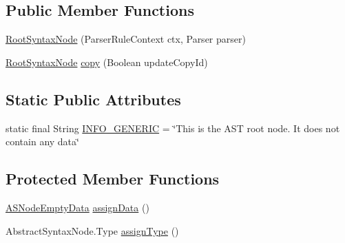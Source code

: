\subsection*{Public Member Functions}
\begin{DoxyCompactItemize}
\item 
\hyperlink{classit_1_1emarolab_1_1cagg_1_1core_1_1language_1_1syntax_1_1abstractTree_1_1syntaxNodeType_1_1RootSyntaxNode_a3692f3edf677c616782e5da24f178bc6}{Root\-Syntax\-Node} (Parser\-Rule\-Context ctx, Parser parser)
\item 
\hyperlink{classit_1_1emarolab_1_1cagg_1_1core_1_1language_1_1syntax_1_1abstractTree_1_1syntaxNodeType_1_1RootSyntaxNode}{Root\-Syntax\-Node} \hyperlink{classit_1_1emarolab_1_1cagg_1_1core_1_1language_1_1syntax_1_1abstractTree_1_1syntaxNodeType_1_1RootSyntaxNode_a4d89573e4fa58984d5598d7b91ade117}{copy} (Boolean update\-Copy\-Id)
\end{DoxyCompactItemize}
\subsection*{Static Public Attributes}
\begin{DoxyCompactItemize}
\item 
static final String \hyperlink{classit_1_1emarolab_1_1cagg_1_1core_1_1language_1_1syntax_1_1abstractTree_1_1syntaxNodeType_1_1RootSyntaxNode_aee261e5c83bc00359e59e8fe6089de6a}{I\-N\-F\-O\-\_\-\-G\-E\-N\-E\-R\-I\-C} = \char`\"{}This is the A\-S\-T root node. It does not contain any data\char`\"{}
\end{DoxyCompactItemize}
\subsection*{Protected Member Functions}
\begin{DoxyCompactItemize}
\item 
\hyperlink{classit_1_1emarolab_1_1cagg_1_1core_1_1language_1_1syntax_1_1abstractTree_1_1AbstractDataFactory_1_1ASNodeEmptyData}{A\-S\-Node\-Empty\-Data} \hyperlink{classit_1_1emarolab_1_1cagg_1_1core_1_1language_1_1syntax_1_1abstractTree_1_1syntaxNodeType_1_1RootSyntaxNode_a039c62155f18efeccc790981b6149aaa}{assign\-Data} ()
\item 
Abstract\-Syntax\-Node.\-Type \hyperlink{classit_1_1emarolab_1_1cagg_1_1core_1_1language_1_1syntax_1_1abstractTree_1_1syntaxNodeType_1_1RootSyntaxNode_a47add34cdaca498c25e5b9b4d237fe22}{assign\-Type} ()
\end{DoxyCompactItemize}


